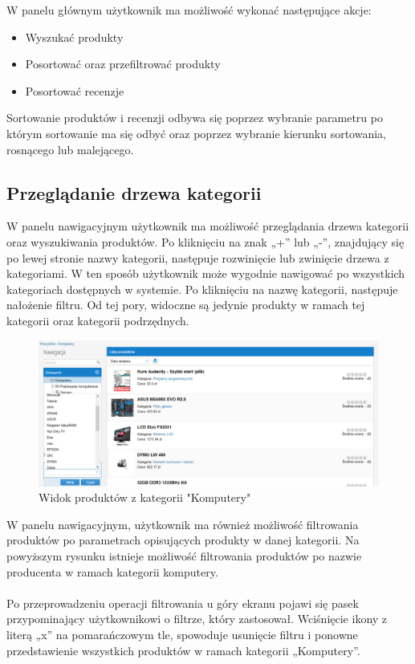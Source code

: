 W panelu głównym użytkownik ma możliwość wykonać następujące akcje:

\begin{itemize}
\item Wyszukać produkty
\item Posortować oraz przefiltrować produkty
\item Posortować recenzje
\end{itemize}

Sortowanie produktów i recenzji odbywa się poprzez wybranie parametru po którym sortowanie ma się odbyć oraz poprzez wybranie kierunku sortowania, rosnącego lub malejącego.

\subsection{Przeglądanie drzewa kategorii}

W panelu nawigacyjnym użytkownik ma możliwość przeglądania drzewa kategorii oraz wyszukiwania produktów. Po kliknięciu na znak „+” lub „-”, znajdujący się po lewej stronie nazwy kategorii, następuje rozwinięcie lub zwinięcie drzewa z kategoriami. W ten sposób użytkownik może wygodnie nawigować po wszystkich kategoriach dostępnych w systemie. Po kliknięciu na nazwę kategorii, następuje nałożenie filtru. Od tej pory, widoczne są jedynie produkty w ramach tej kategorii oraz kategorii podrzędnych.

\begin{figure}[h]
	\centering
	\includegraphics[width=1.00\textwidth]{images/filtr_kategorii.png}
	\caption{Widok produktów z kategorii "Komputery"}
\end{figure}

W panelu nawigacyjnym, użytkownik ma również możliwość filtrowania produktów po parametrach opisujących produkty w danej kategorii. Na powyższym rysunku istnieje możliwość filtrowania produktów po nazwie producenta w ramach kategorii komputery.
\paragraph{}
Po przeprowadzeniu operacji filtrowania u góry ekranu pojawi się pasek przypominający użytkownikowi o filtrze, który zastosował. Wciśnięcie ikony z literą „x” na pomarańczowym tle, spowoduje usunięcie filtru i ponowne przedstawienie wszystkich produktów w ramach kategorii „Komputery”.

